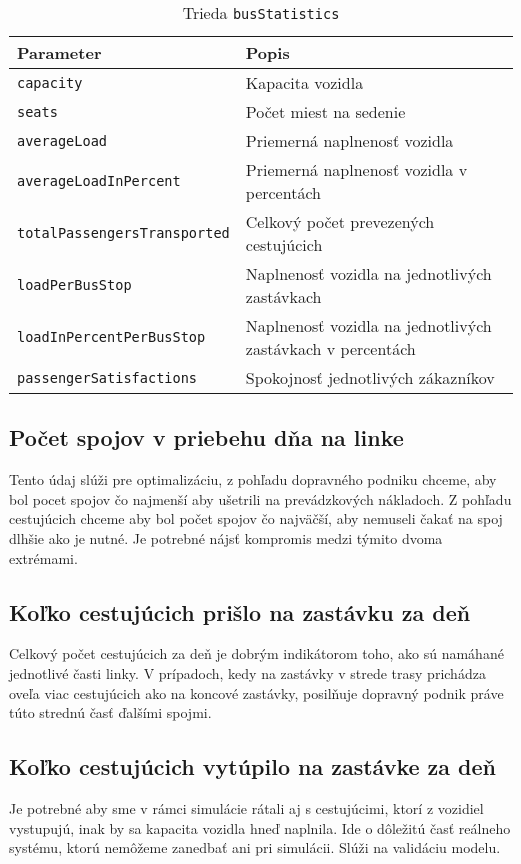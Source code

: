 \begin{table}[h]\label{tab:busStatistics_class}
  \centering
  \begin{tabularx}{\textwidth}{|l|X|}
    \hline
    \textbf{Parameter} & \textbf{Popis} \\ \hline
    \texttt{capacity} & Kapacita vozidla \\ \hline
    \texttt{seats} & Počet miest na sedenie \\ \hline
    \texttt{averageLoad} & Priemerná naplnenosť vozidla \\ \hline
    \texttt{averageLoadInPercent} & Priemerná naplnenosť vozidla v percentách \\ \hline
    \texttt{totalPassengersTransported} & Celkový počet prevezených cestujúcich \\ \hline
    \texttt{loadPerBusStop} & Naplnenosť vozidla na jednotlivých zastávkach \\ \hline
    \texttt{loadInPercentPerBusStop} & Naplnenosť vozidla na jednotlivých zastávkach v percentách \\ \hline
    \texttt{passengerSatisfactions} & Spokojnosť jednotlivých zákazníkov \\ \hline
  \end{tabularx}
  \caption{Trieda \texttt{busStatistics}}
\end{table}

\subsection*{Počet spojov v priebehu dňa na linke}
Tento údaj slúži pre optimalizáciu, z pohľadu dopravného podniku chceme, aby bol pocet spojov čo najmenší aby ušetrili na prevádzkových nákladoch.
Z pohľadu cestujúcich chceme aby bol počet spojov čo najväčší, aby nemuseli čakať na spoj dlhšie ako je nutné.
Je potrebné nájsť kompromis medzi týmito dvoma extrémami.

\subsection*{Koľko cestujúcich prišlo na zastávku za deň}
Celkový počet cestujúcich za deň je dobrým indikátorom toho, ako sú namáhané jednotlivé časti linky.
V prípadoch, kedy na zastávky v strede trasy prichádza oveľa viac cestujúcich ako na koncové zastávky, posilňuje dopravný podnik práve túto strednú časť ďalšími spojmi.

\subsection*{Koľko cestujúcich vytúpilo na zastávke za deň}
Je potrebné aby sme v rámci simulácie rátali aj s cestujúcimi, ktorí z vozidiel vystupujú, inak by sa kapacita vozidla hneď naplnila.
Ide o dôležitú časť reálneho systému, ktorú nemôžeme zanedbať ani pri simulácii.
Slúži na validáciu modelu.

